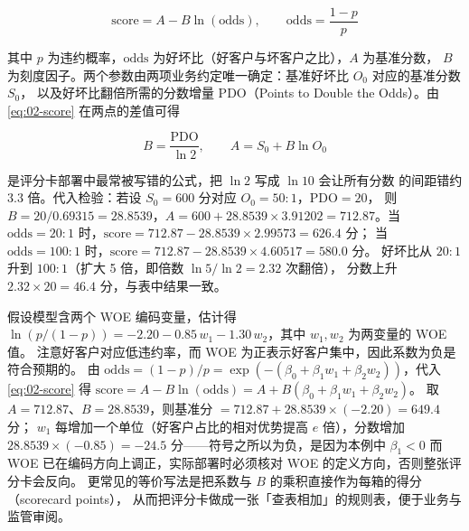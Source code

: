 \begin{equation}\label{eq:02-score}
  \mathrm{score} = A - B\ln(\mathrm{odds}), \qquad \mathrm{odds} = \frac{1-p}{p}
\end{equation}

其中 $p$ 为违约概率，$\mathrm{odds}$ 为好坏比（好客户与坏客户之比），$A$ 为基准分数，
$B$ 为刻度因子。两个参数由两项业务约定唯一确定：基准好坏比 $O_0$ 对应的基准分数 $S_0$，
以及好坏比翻倍所需的分数增量 $\mathrm{PDO}$（Points to Double the Odds）。由
\cref{eq:02-score} 在两点的差值可得

\begin{equation}\label{eq:02-pdo}
  B = \frac{\mathrm{PDO}}{\ln 2}, \qquad A = S_0 + B\ln O_0
\end{equation}

 是评分卡部署中最常被写错的公式，把 $\ln 2$ 写成 $\ln 10$ 会让所有分数
的间距错约 $3.3$ 倍。代入检验：若设 $S_0 = 600$ 分对应 $O_0 = 50:1$，$\mathrm{PDO} = 20$，
则 $B = 20/0.69315 = 28.8539$，$A = 600 + 28.8539 \times 3.91202 = 712.87$。当
$\mathrm{odds} = 20:1$ 时，$\mathrm{score} = 712.87 - 28.8539 \times 2.99573 = 626.4$ 分；
当 $\mathrm{odds} = 100:1$ 时，$\mathrm{score} = 712.87 - 28.8539 \times 4.60517 = 580.0$ 分。
好坏比从 $20:1$ 升到 $100:1$（扩大 5 倍，即倍数 $\ln 5/\ln 2 = 2.32$ 次翻倍），
分数上升 $2.32 \times 20 = 46.4$ 分，与表中结果一致。

\begin{example}[由逻辑回归系数直接写出评分卡]\label{ex:02-scorecard}
假设模型含两个 WOE 编码变量，估计得
$\ln(p/(1-p)) = -2.20 - 0.85\,w_1 - 1.30\,w_2$，其中 $w_1, w_2$ 为两变量的 WOE 值。
注意好客户对应低违约率，而 WOE 为正表示好客户集中，因此系数为负是符合预期的。
由 $\mathrm{odds} = (1-p)/p = \exp(-(\beta_0 + \beta_1 w_1 + \beta_2 w_2))$，代入
\cref{eq:02-score} 得
$\mathrm{score} = A - B\ln(\mathrm{odds}) = A + B(\beta_0 + \beta_1 w_1 + \beta_2 w_2)$。
取 $A = 712.87$、$B = 28.8539$，则基准分 $= 712.87 + 28.8539 \times (-2.20) = 649.4$ 分；
$w_1$ 每增加一个单位（好客户占比的相对优势提高 $e$ 倍），分数增加
$28.8539 \times (-0.85) = -24.5$ 分——符号之所以为负，是因为本例中 $\beta_1 < 0$ 而
WOE 已在编码方向上调正，实际部署时必须核对 WOE 的定义方向，否则整张评分卡会反向。
更常见的等价写法是把系数与 $B$ 的乘积直接作为每箱的得分（scorecard points），
从而把评分卡做成一张「查表相加」的规则表，便于业务与监管审阅。
\end{example}

